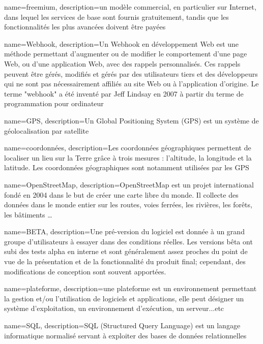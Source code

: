 \makeglossaries
 
{
    name=freemium,
    description={un modèle commercial, en particulier sur Internet, dans lequel les services de base sont fournis gratuitement, tandis que les fonctionnalités les plus avancées doivent être payées}
}

{
    name=Webhook,
    description={Un Webhook en développement Web est une méthode permettant d’augmenter ou de modifier le comportement d’une page Web, ou d’une application Web, avec des rappels personnalisés. Ces rappels peuvent être gérés, modifiés et gérés par des utilisateurs tiers et des développeurs qui ne sont pas nécessairement affiliés au site Web ou à l'application d'origine. Le terme "webhook" a été inventé par Jeff Lindsay en 2007 à partir du terme de programmation pour ordinateur\cite{noauthor_webhook_2019}}
}

{
    name=GPS,
    description={Un Global Positioning System (GPS) est un système de géolocalisation par satellite}
}

{
    name=coordonnées,
    description={Les coordonnées géographiques permettent de localiser un lieu sur la Terre grâce à trois mesures : l'altitude, la longitude et la latitude. Les coordonnées géographiques sont notamment utilisées par les GPS}
}

{
    name=OpenStreetMap,
    description={OpenStreetMap est un projet international fondé en 2004 dans le but de créer une carte libre du monde. Il collecte des données dans le monde entier sur les routes, voies ferrées, les rivières, les forêts, les bâtiments …}
}

{
	name=BETA,
	description={Une pré-version du logiciel est donnée à un grand groupe d’utilisateurs à essayer dans des conditions réelles. Les versions bêta ont subi des tests alpha en interne et sont généralement assez proches du point de vue de la présentation et de la fonctionnalité du produit final; cependant, des modifications de conception sont souvent apportées.\cite{noauthor_beta_nodate}}
}

{
    name=plateforme,
    description={une plateforme est un environnement permettant la gestion et/ou l'utilisation de logiciels et applications, elle peut désigner un système d'exploitation, un environnement d'exécution, un serveur...etc}
}

{
    name=SQL,
    description={SQL (Structured Query Language) est un langage informatique normalisé servant à exploiter des bases de données relationnelles}
}

